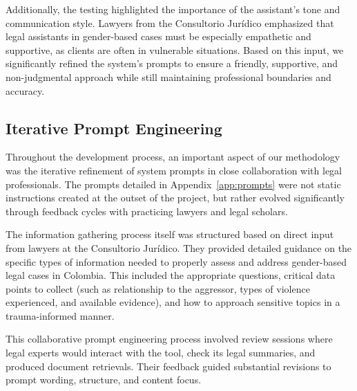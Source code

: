 Additionally, the testing highlighted the importance of the assistant's tone and communication style. Lawyers from the Consultorio Jurídico emphasized that legal assistants 
in gender-based cases must be especially empathetic and supportive, as clients are often in vulnerable situations. Based on this input, we significantly refined the system's 
prompts to ensure a friendly, supportive, and non-judgmental approach while still maintaining professional boundaries and accuracy.

\subsection{Iterative Prompt Engineering}
\label{subsec:prompt-engineering}

Throughout the development process, an important aspect of our methodology was the iterative refinement of system prompts in close collaboration with legal professionals. 
The prompts detailed in Appendix~\ref{app:prompts} were not static instructions created at the outset of the project, but rather evolved significantly through  
feedback cycles with practicing lawyers and legal scholars. 

The information gathering process itself was structured based on direct input from lawyers at the Consultorio Jurídico. They provided detailed guidance on the specific types of 
information needed to properly assess and address gender-based legal cases in Colombia. This included the appropriate questions, critical data points to collect 
(such as relationship to the aggressor, types of violence experienced, and available evidence), and how to approach sensitive topics in a trauma-informed manner.

This collaborative prompt engineering process involved review sessions where legal experts would interact with the tool, check its legal summaries, and produced document 
retrievals. Their feedback guided substantial revisions to prompt wording, structure, and content focus.

